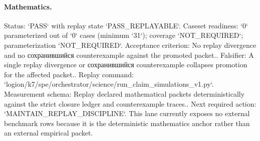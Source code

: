 \paragraph{Mathematics.}
Status: `PASS` with replay state `PASS\_REPLAYABLE`.
Caseset readiness: `0` parameterized out of `0` cases (minimum `31`); coverage `NOT\_REQUIRED`; parameterization `NOT\_REQUIRED`.
Acceptance criterion: No replay divergence and no сохранившийся counterexample against the promoted packet..
Falsifier: A single replay divergence or сохранившийся counterexample collapses promotion for the affected packet..
Replay command: `logion/k7/spe/orchestrator/science/run\_claim\_simulations\_v1.py`.
Measurement schema: Replay declared mathematical packets deterministically against the strict closure ledger and counterexample traces..
Next required action: `MAINTAIN\_REPLAY\_DISCIPLINE`.
This lane currently exposes no external benchmark rows because it is the deterministic mathematics anchor rather than an external empirical packet.

